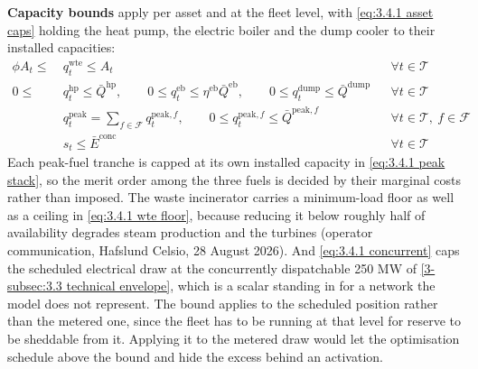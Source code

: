 \textbf{Capacity bounds} apply per asset and at the fleet level, with \autoref{eq:3.4.1 asset caps} holding the heat pump, the electric boiler and the dump cooler to their installed capacities:
\begin{align}
    \phi A_t \leq &\ q^{\text{wte}}_t \leq A_t && \forall t \in \mathcal{T} \label{eq:3.4.1 wte floor} \\
    0 \leq &\ q^{\text{hp}}_t \leq \bar{Q}^{\text{hp}}, \qquad 0 \leq q^{\text{eb}}_t \leq \eta^{\text{eb}} \bar{Q}^{\text{eb}}, \qquad 0 \leq q^{\text{dump}}_t \leq \bar{Q}^{\text{dump}} && \forall t \in \mathcal{T} \label{eq:3.4.1 asset caps} \\
    &\ q^{\text{peak}}_t = \sum_{f \in \mathcal{F}} q^{\text{peak},f}_t, \qquad 0 \leq q^{\text{peak},f}_t \leq \bar{Q}^{\text{peak},f} && \forall t \in \mathcal{T},\ f \in \mathcal{F} \label{eq:3.4.1 peak stack} \\
    &\ s_t \leq \bar{E}^{\text{conc}} && \forall t \in \mathcal{T} \label{eq:3.4.1 concurrent}
\end{align}
Each peak-fuel tranche is capped at its own installed capacity in \autoref{eq:3.4.1 peak stack}, so the merit order among the three fuels is decided by their marginal costs rather than imposed. The waste incinerator carries a minimum-load floor as well as a ceiling in \autoref{eq:3.4.1 wte floor}, because reducing it below roughly half of availability degrades steam production and the turbines (operator communication, Hafslund Celsio, 28 August 2026). And \autoref{eq:3.4.1 concurrent} caps the scheduled electrical draw at the concurrently dispatchable 250 MW of \autoref{3-subsec:3.3 technical envelope}, which is a scalar standing in for a network the model does not represent. The bound applies to the scheduled position rather than the metered one, since the fleet has to be running at that level for reserve to be sheddable from it. Applying it to the metered draw would let the optimisation schedule above the bound and hide the excess behind an activation.

